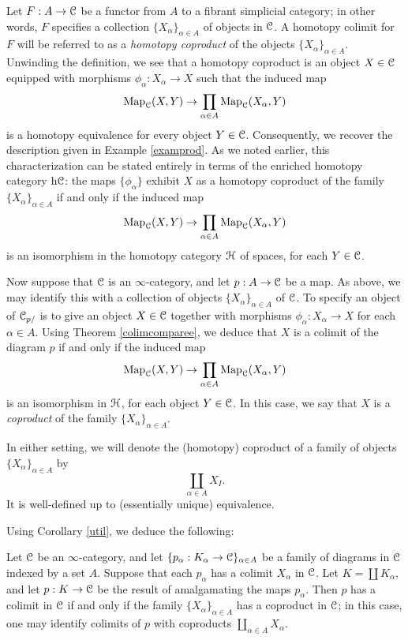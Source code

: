 Let $F: A \rightarrow \operatorname{\mathcal{C}}$ be a functor from $A$ to a fibrant simplicial category; in other words, $F$ specifies a collection $\{ X_{\alpha} \}_{\alpha \in A}$ of objects in $\operatorname{\mathcal{C}}$. A homotopy colimit for $F$ will be referred to as a {\it homotopy coproduct} of the objects $\{ X_{\alpha} \}_{\alpha \in A}$. Unwinding the definition, we see that a homotopy coproduct is an object $X \in \operatorname{\mathcal{C}}$ equipped with morphisms
$\phi_{\alpha}: X_{\alpha} \rightarrow X$ such that the induced map
$$ \operatorname{{Map}}_{\operatorname{\mathcal{C}}}(X,Y) \rightarrow \prod_{\alpha \in A} \operatorname{{Map}}_{\operatorname{\mathcal{C}}}(X_{\alpha},Y)$$ 
is a homotopy equivalence for every object $Y \in \operatorname{\mathcal{C}}$. 
Consequently, we recover the description given in Example \ref{examprod}. As we noted earlier, this characterization can be stated entirely in terms of the enriched homotopy category $\rm{h} \it{\operatorname{\mathcal{C}}}$: the maps $\{ \phi_{\alpha} \} $ exhibit $X$ as a homotopy coproduct of the family $\{ X_{\alpha} \}_{\alpha \in A}$
if and only if the induced map
$$ \operatorname{{Map}}_{\operatorname{\mathcal{C}}}(X,Y) \rightarrow \prod_{\alpha \in A} \operatorname{{Map}}_{\operatorname{\mathcal{C}}}(X_{\alpha},Y)$$ is an isomorphism in the homotopy category $\operatorname{\mathcal{H}}$ of spaces, for each $Y \in \operatorname{\mathcal{C}}$.

Now suppose that $\operatorname{\mathcal{C}}$ is an $\infty$-category, and let $p: A \rightarrow \operatorname{\mathcal{C}}$ be a map. 
As above, we may identify this with a collection of objects $\{ X_{\alpha} \}_{\alpha \in A}$ of $\operatorname{\mathcal{C}}$. 
To specify an object of $\operatorname{\mathcal{C}}_{p/}$ is to give an object $X \in \operatorname{\mathcal{C}}$ together with morphisms
$\phi_{\alpha}: X_{\alpha} \rightarrow X$ for each $\alpha \in A$. Using Theorem \ref{colimcomparee}, we deduce that
$X$ is a colimit of the diagram $p$ if and only if the induced map
$$ \operatorname{{Map}}_{\operatorname{\mathcal{C}}}(X,Y) \rightarrow \prod_{\alpha \in A} \operatorname{{Map}}_{\operatorname{\mathcal{C}}}(X_{\alpha},Y)$$
is an isomorphism in $\operatorname{\mathcal{H}}$, for each object $Y \in \operatorname{\mathcal{C}}$. In this case, we say that $X$ is a {\it coproduct} of the family $\{ X_{\alpha} \}_{\alpha \in A}$.

In either setting, we will denote the (homotopy) coproduct of a family of objects $\{ X_\alpha \}_{\alpha \in A}$ by
$$ \coprod_{\alpha \in A} X_I.$$
It is well-defined up to (essentially unique) equivalence.

Using Corollary \ref{util}, we deduce the following:

\begin{proposition}\label{makerus}
Let $\operatorname{\mathcal{C}}$ be an $\infty$-category, and let $\{ p_{\alpha}: K_{\alpha} \rightarrow \operatorname{\mathcal{C}}\}_{\alpha \in A}$ be a family of diagrams in $\operatorname{\mathcal{C}}$ indexed by a set $A$. Suppose that each $p_{\alpha}$ has a colimit $X_{\alpha}$ in $\operatorname{\mathcal{C}}$. Let $K = \coprod K_{\alpha}$, and let $p: K \rightarrow \operatorname{\mathcal{C}}$ be the result of amalgamating the maps $p_{\alpha}$. Then $p$ has a colimit in $\operatorname{\mathcal{C}}$ if and only if the family $\{ X_{\alpha} \}_{\alpha \in A}$ has a coproduct in $\operatorname{\mathcal{C}}$; in this case, one may identify colimits of $p$ with coproducts $ \coprod_{\alpha \in A} X_{\alpha}.$
\end{proposition}

